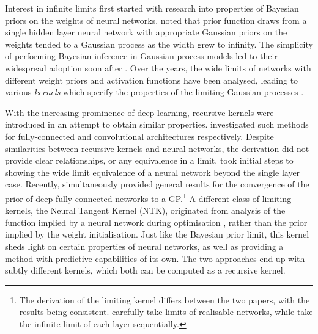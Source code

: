 \documentclass[tablecaption=bottom,wcp,nonatbib]{jmlr} %
\begin{document}
Interest in infinite limits first started with research into properties of Bayesian priors on the weights of neural networks. \citet{neal1996bayesian} noted that prior function draws from a single hidden layer neural network with appropriate Gaussian priors on the weights tended to a Gaussian process as the width grew to infinity. The simplicity of performing Bayesian inference in Gaussian process models led to their widespread adoption soon after \citep{williams1996gpr,gpml}. Over the years, the wide limits of networks with different weight priors and activation functions have been analysed, leading to various \emph{kernels} which specify the properties of the limiting Gaussian processes \citep{williams1997inf,cho2009mkm}.

With the increasing prominence of deep learning, recursive kernels were introduced in an attempt to obtain similar properties. \citet{cho2009mkm,mairal2014ckn} investigated such methods for fully-connected and convolutional architectures respectively. Despite similarities between recursive kernels and neural networks, the derivation did not provide clear relationships, or any equivalence in a limit. \citet{hazan2015} took initial steps to showing the wide limit equivalence of a neural network beyond the single layer case. Recently, \citet{matthews2018dnnlimit,lee2018dnnlimit} simultaneously provided general results for the convergence of the prior of deep fully-connected networks to a GP.\footnote{The derivation of the limiting kernel differs between the two papers, with the results being consistent. \citet{matthews2018dnnlimit} carefully take limits of realisable networks, while \citet{lee2018dnnlimit} take the infinite limit of each layer sequentially.%
} 
A different class of limiting kernels, the Neural Tangent Kernel (NTK), originated from analysis of the function implied by a neural network during optimisation \citep{jacot2018ntk}, rather than the prior implied by the weight initialisation. Just like the Bayesian prior limit, this kernel sheds light on certain properties of neural networks, as well as providing a method with predictive capabilities of its own. 
The two approaches end up with subtly different kernels, which both can be computed as a recursive kernel.
\end{document}
